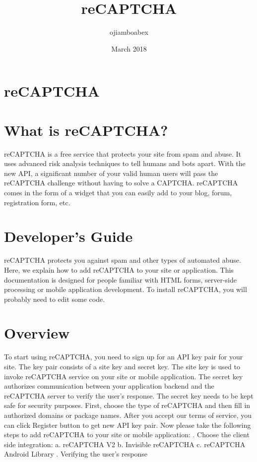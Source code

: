 \documentclass{article}
\title{reCAPTCHA}
\author{ojiamboabex }
\date{March 2018}
\begin{document}
\maketitle

\section{reCAPTCHA}
\section{What is reCAPTCHA?}

reCAPTCHA is a free service that protects your site from spam and abuse. It uses advanced risk analysis techniques to tell humans and bots apart. With the new API, a significant number of your valid human users will pass the reCAPTCHA challenge without having to solve a CAPTCHA. reCAPTCHA comes in the form of a widget that you can easily add to your blog, forum, registration form, etc.
\section{Developer's Guide}
reCAPTCHA protects you against spam and other types of automated abuse. Here, we explain how to add reCAPTCHA to your site or application.
\newline This documentation is designed for people familiar with HTML forms, server-side processing or mobile application development. To install reCAPTCHA, you will probably need to edit some code.
\section{Overview}
To start using reCAPTCHA, you need to sign up for an API key pair for your site. The key pair consists of a site key and secret key. The site key is used to invoke reCAPTCHA service on your site or mobile application. The secret key authorizes communication between your application backend and the reCAPTCHA server to verify the user's response. The secret key needs to be kept safe for security purposes.
\newline First, choose the type of reCAPTCHA and then fill in authorized domains or package names. After you accept our terms of service, you can click Register button to get new API key pair.
Now please take the following steps to add reCAPTCHA to your site or mobile application:
.	Choose the client side integration:
\newline a.	reCAPTCHA V2
\newline b.	Invisible reCAPTCHA
\newline c.	reCAPTCHA Android Library
.	Verifying the user's response
\end{document}
